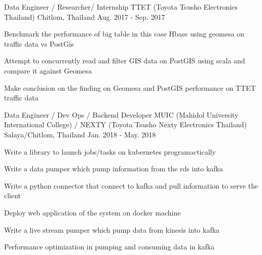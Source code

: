 \begin{cventries}
  \cventry
    {Data Engineer / Researcher/ Internship} %
    {TTET (Toyota Tsusho Electronics Thailand)} %
    {Chitlom, Thailand} %
    {Aug. 2017 - Sep. 2017} %
    {
      \begin{cvitems} %
        \item {Benchmark the performance of big table in this case Hbase using geomesa on traffic data vs PostGis}
        \item {Attempt to concurrently read and filter GIS data on PostGIS using scala and compare it against Geomesa}
        \item {Make conclusion on the finding on Geomesa and PostGIS performance on TTET traffic data}
      \end{cvitems}
    }

  \cventry
    {Data Engineer / Dev Ops / Backend Developer} %
    {MUIC (Mahidol University International College) / NEXTY (Toyota Tsusho Nexty Electronics Thailand)} %
    {Salaya/Chitlom, Thailand} %
    {Jan. 2018 - May. 2018} %
    {
      \begin{cvitems} %
        \item {Write a library to launch jobs/tasks on kubernetes programactically}
        \item {Write a data pumper which pump information from the rds into kafka}
        \item {Write a python connector that connect to kafka and pull information to serve the client}
        \item {Deploy web application of the system on docker machine}
        \item {Write a live stream pumper which pump data from kinesis into kafka}
        \item {Performance optimization in pumping and consuming data in kafka}
      \end{cvitems}
    }
\end{cventries}
